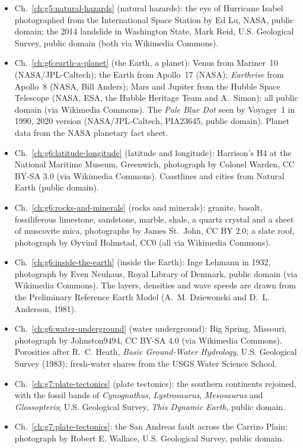 \begin{itemize}
  \item Ch.~\ref{ch:g5:natural-hazards} (natural hazards): the eye of Hurricane Isabel photographed from the International Space Station by Ed Lu, NASA, public domain; the 2014 landslide in Washington State, Mark Reid, U.S. Geological Survey, public domain (both via Wikimedia Commons).
  \item Ch.~\ref{ch:g6:earth-a-planet} (the Earth, a planet): Venus from Mariner~10 (NASA/JPL-Caltech); the Earth from Apollo~17 (NASA); \emph{Earthrise} from Apollo~8 (NASA, Bill Anders); Mars and Jupiter from the Hubble Space Telescope (NASA, ESA, the Hubble Heritage Team and A.~Simon); all public domain (via Wikimedia Commons). The \emph{Pale Blue Dot} seen by Voyager~1 in 1990, 2020 version (NASA/JPL-Caltech, PIA23645, public domain). Planet data from the NASA planetary fact sheet.
  \item Ch.~\ref{ch:g6:latitude-longitude} (latitude and longitude): Harrison's H4 at the National Maritime Museum, Greenwich, photograph by Colonel Warden, CC BY-SA 3.0 (via Wikimedia Commons). Coastlines and cities from Natural Earth (public domain).
  \item Ch.~\ref{ch:g6:rocks-and-minerals} (rocks and minerals): granite, basalt, fossiliferous limestone, sandstone, marble, shale, a quartz crystal and a sheet of muscovite mica, photographs by James St.~John, CC BY 2.0; a slate roof, photograph by Øyvind Holmstad, CC0 (all via Wikimedia Commons).
  \item Ch.~\ref{ch:g6:inside-the-earth} (inside the Earth): Inge Lehmann in 1932, photograph by Even Neuhaus, Royal Library of Denmark, public domain (via Wikimedia Commons). The layers, densities and wave speeds are drawn from the Preliminary Reference Earth Model (A.~M. Dziewonski and D.~L. Anderson, 1981).
  \item Ch.~\ref{ch:g6:water-underground} (water underground): Big Spring, Missouri, photograph by Johnston9494, CC BY-SA 4.0 (via Wikimedia Commons). Porosities after R.~C. Heath, \emph{Basic Ground-Water Hydrology}, U.S. Geological Survey (1983); fresh-water shares from the USGS Water Science School.
  \item Ch.~\ref{ch:g7:plate-tectonics} (plate tectonics): the southern continents rejoined, with the fossil bands of \emph{Cynognathus}, \emph{Lystrosaurus}, \emph{Mesosaurus} and \emph{Glossopteris}; U.S. Geological Survey, \emph{This Dynamic Earth}, public domain.
  \item Ch.~\ref{ch:g7:plate-tectonics}: the San Andreas fault across the Carrizo Plain; photograph by Robert E. Wallace, U.S. Geological Survey, public domain.

\end{itemize}
